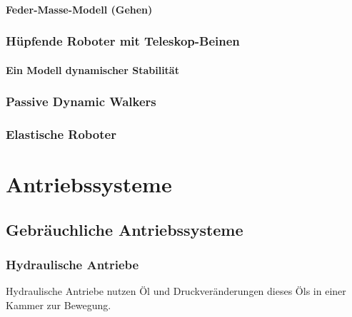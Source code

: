 \documentclass[a4paper, 11pt, accentcolor = tud3b]{tudreport}
\begin{document}
				\subsubsection{Feder-Masse-Modell (Gehen)} %

			\subsection{Hüpfende Roboter mit Teleskop-Beinen} %

				\subsubsection{Ein Modell dynamischer Stabilität} %

			\subsection{Passive Dynamic Walkers} %

			\subsection{Elastische Roboter} %

	\chapter{Antriebssysteme} %
		\section{Gebräuchliche Antriebssysteme}
			\subsection{Hydraulische Antriebe}
				Hydraulische Antriebe nutzen Öl und Druckveränderungen dieses Öls in einer Kammer zur Bewegung.
				
\end{document}
